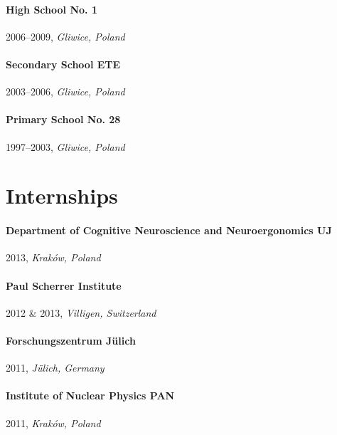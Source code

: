 \paragraph{High School No. 1} 2006--2009, \emph{Gliwice, Poland}

\paragraph{Secondary School ETE} 2003--2006, \emph{Gliwice, Poland}

\paragraph{Primary School No. 28} 1997--2003, \emph{Gliwice, Poland}







\bigskip

\section*{Internships}
\paragraph{Department of Cognitive Neuroscience and Neuroergonomics UJ} 2013, \emph{Kraków, Poland}
\paragraph{Paul Scherrer Institute} 2012 \& 2013, \emph{Villigen, Switzerland}
\paragraph{Forschungszentrum Jülich} 2011, \emph{Jülich, Germany}
\paragraph{Institute of Nuclear Physics PAN} 2011, \emph{Kraków, Poland}



\endgroup
